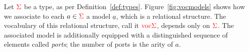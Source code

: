 \begin{definition} Let ${\color{red}{\Sigma}}$ be a type, as per Definition~\ref{def:types}.  Figure~\ref{fig:vocmodels} shows how we associate  to each $a \in {\color{red}{\Sigma}}$ a model $\underline a$, which is a relational structure. The vocabulary of this relational structure, call it ${\color{red}{\mathrm{voc}}}{\color{red}{\Sigma}}$, depends only  on ${\color{red}{\Sigma}}$. The associated model is additionally equipped  with a distinguished sequence of elements called \emph{ports};  the number of ports is the arity of $a$.   
\end{definition}


\newcommand{\vocline}[3]{\\ $#1$ & $#2$ & \begin{minipage}{0,6\textwidth}
    #3
\end{minipage}\\}

